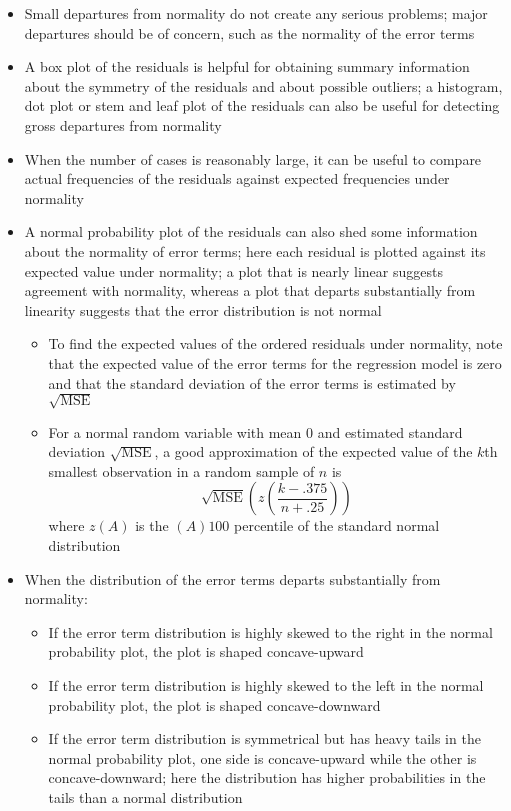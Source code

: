\begin{itemize}
\item Small departures from normality do not create any serious problems; major departures should be of concern, such as the normality of the error terms 
\item A box plot of the residuals is helpful for obtaining summary information about the symmetry of the residuals and about possible outliers; a histogram, dot plot or stem and leaf plot of the residuals can also be useful for detecting gross departures from normality 
\item When the number of cases is reasonably large, it can be useful to compare actual frequencies of the residuals against expected frequencies under normality 
\item A normal probability plot of the residuals can also shed some information about the normality of error terms; here each residual is plotted against its expected value under normality; a plot that is nearly linear suggests agreement with normality, whereas a plot that departs substantially from linearity suggests that the error distribution is not normal \begin{itemize} 
\item To find the expected values of the ordered residuals under normality, note that the expected value of the error terms for the regression model is zero and that the standard deviation of the error terms is estimated by $\sqrt{\text{MSE}}$ 
\item For a normal random variable with mean $0$ and estimated standard deviation $\sqrt{\text{MSE}}$, a good approximation of the expected value of the $k$th smallest observation in a random sample of $n$ is 
$$ \sqrt{\text{MSE}}\left( z\left(\frac{k - .375}{n + .25}\right)\right) $$ where $z(A)$ is the $(A)100$ percentile of the standard normal distribution \end{itemize} 
\item When the distribution of the error terms departs substantially from normality: \begin{itemize} 
\item If the error term distribution is highly skewed to the right in the normal probability plot, the plot is shaped concave-upward
\item If the error term distribution is highly skewed to the left in the normal probability plot, the plot is shaped concave-downward 
\item If the error term distribution is symmetrical but has heavy tails in the normal probability plot, one side is concave-upward while the other is concave-downward; here the distribution has higher probabilities in the tails than a normal distribution \end{itemize} 

\end{itemize}
